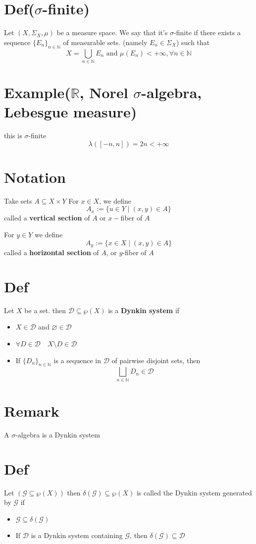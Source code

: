 \documentclass{book}
\begin{document}
\section{Def($\sigma$-finite)}
Let $(X,\Sigma_X,\mu)$ be a measure space. We say that it's $\sigma$-finite if there exists a sequence $\{E_n\}_{n\in \mathbb{N}}$ of measurable sets. (namely $E_n\in \Sigma_X$) such that $$X=\bigcup\limits_{n\in \mathbb{N}}E_n\text{ and }\mu(E_n)<+\infty, \forall n\in \mathbb{N}$$
\section{Example($\mathbb{R}$, Norel $\sigma$-algebra, Lebesgue measure)}
this is $\sigma$-finite$$\lambda([-n,n])=2n<+\infty$$
\section{Notation}
Take sets $A\subseteq X\times Y$ For $x\in X$, we define
$$A_x:=\{u\in Y\mid(x,y)\in A\}$$
called a \textbf{vertical section} of $A$ or $x-$fiber of $A$

For $y\in Y$ we define
$$A_y:=\{x\in X\mid(x,y)\in A\}$$
called a \textbf{horizontal section} of $A$, or $y$-fiber of $A$
\section{Def}
Let $X$ be a set. then $\mathscr{D}\subseteq\wp(X)$ is a \textbf{Dynkin system} if 
\begin{itemize}
    \item $X\in \mathscr{D}$ and $\varnothing\in \mathscr{D}$
    \item $\forall D\in \mathscr{D}\quad X\setminus D\in \mathscr{D}$
    \item If $\{D_n\}_{n\in \mathbb{N}}$ is a sequence in $\mathscr{D}$ of pairwise disjoint sets, then $$\bigsqcup\limits_{n\in \mathbb{N}}D_n\in \mathscr{D}$$
\end{itemize}
\section*{Remark}
A $\sigma$-algebra is a Dynkin system
\section{Def}
Let $(\mathcal{G}\subseteq\wp(X))$ then $\delta(\mathcal{G})\subseteq\wp(X)$ is called the Dynkin system generated by $\mathcal{G}$ if \begin{itemize}
    \item $\mathcal{G}\subseteq\delta(\mathcal{G})$
    \item If $\mathscr{D}$ is a Dynkin system containing $\mathcal{G}$, then $\delta(\mathcal{G})\subseteq\mathscr{D}$
\end{itemize}
\end{document}
